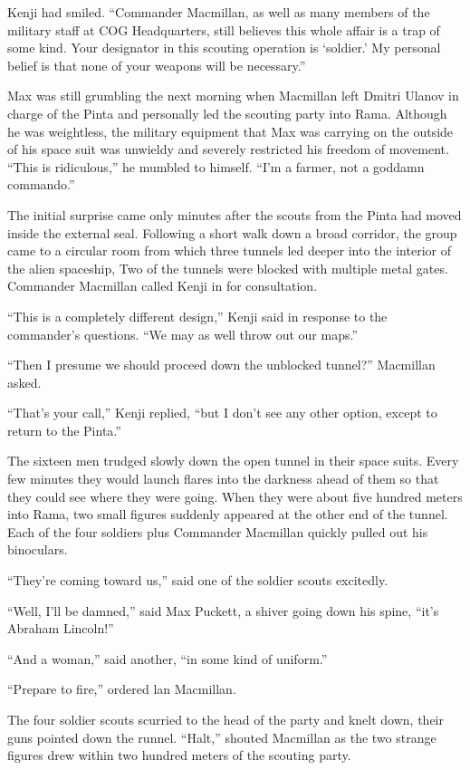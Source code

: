 \documentclass[]{article}
\begin{document}
{Kenji had smiled. “Commander Macmillan, as well as many members of the military staff at COG Headquarters, still believes this whole affair is a trap of some kind. Your designator in this scouting operation is ‘soldier.’ My personal belief is that none of your weapons will be necessary.”

Max was still grumbling the next morning when Macmillan left Dmitri Ulanov in charge of the Pinta and personally led the scouting party into Rama. Although he was weightless, the military equipment that Max was carrying on the outside of his space suit was unwieldy and severely restricted his freedom of movement. “This is ridiculous,” he mumbled to himself. “I’m a farmer, not a goddamn commando.”

The initial surprise came only minutes after the scouts from the Pinta had moved inside the external seal. Following a short walk down a broad corridor, the group came to a circular room from which three tunnels led deeper into the interior of the alien spaceship, Two of the tunnels were blocked with multiple metal gates. Commander Macmillan called Kenji in for consultation.

“This is a completely different design,” Kenji said in response to the commander’s questions. “We may as well throw out our maps.”

“Then I presume we should proceed down the unblocked tunnel?” Macmillan asked.

“That’s your call,” Kenji replied, “but I don’t see any other option, except to return to the Pinta.”

The sixteen men trudged slowly down the open tunnel in their space suits. Every few minutes they would launch flares into the darkness ahead of them so that they could see where they were going. When they were about five hundred meters into Rama, two small figures suddenly appeared at the other end of the tunnel. Each of the four soldiers plus Commander Macmillan quickly pulled out his binoculars.

“They’re coming toward us,” said one of the soldier scouts excitedly.

“Well, I’ll be damned,” said Max Puckett, a shiver going down his spine, “it’s Abraham Lincoln!”

“And a woman,” said another, “in some kind of uniform.”

“Prepare to fire,” ordered lan Macmillan.

The four soldier scouts scurried to the head of the party and knelt down, their guns pointed down the runnel. “Halt,” shouted Macmillan as the two strange figures drew within two hundred meters of the scouting party.

}
\end{document}
